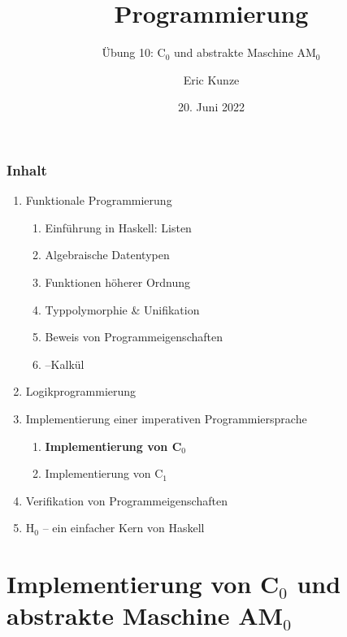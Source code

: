 \documentclass{beamer}
\begin{document}
	
	\title{Programmierung}
	\subtitle{Übung 10: C${}_\text{0}$ und abstrakte Maschine AM${}_\text{0}$}
	\author{Eric Kunze}
	\date{20. Juni 2022}
	
	\maketitle
	


\begin{frame}[fragile] \frametitle{Inhalt}
	\begin{enumerate}
		\item Funktionale Programmierung
		\begin{enumerate}
			\item Einführung in Haskell: Listen
			\item Algebraische Datentypen
			\item Funktionen höherer Ordnung
			\item Typpolymorphie \& Unifikation
			\item Beweis von Programmeigenschaften
			\item \textlambda--Kalkül
		\end{enumerate}
		\item Logikprogrammierung
		\item Implementierung einer imperativen Programmiersprache
		\begin{enumerate}
			\item \textbf{Implementierung von C${}_\text{0}$}
			\item Implementierung von C${}_\text{1}$
		\end{enumerate}
		\item Verifikation von Programmeigenschaften
		\item H${}_\text{0}$ -- ein einfacher Kern von Haskell
	\end{enumerate}
\end{frame}



\section{Implementierung von C${}_\text{0}$ und abstrakte Maschine AM${}_\text{0}$}
\end{document}

